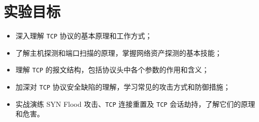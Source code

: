 \section{实验目标}
\begin{itemize}
\item 深入理解 \texttt{TCP} 协议的基本原理和工作方式；
\item 了解主机探测和端口扫描的原理，掌握网络资产探测的基本技能；
\item 理解 \texttt{TCP} 的报文结构，包括协议头中各个参数的作用和含义；
\item 加深对 \texttt{TCP} 协议安全缺陷的理解，学习常见的攻击方式和防御措施；
\item 实战演练 SYN Flood 攻击、\texttt{TCP} 连接重置及 \texttt{TCP} 会话劫持，了解它们的原理和危害。
\end{itemize}
